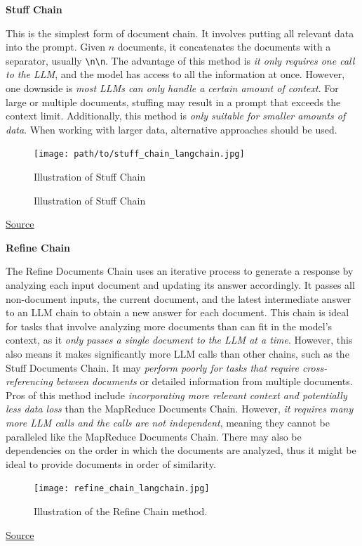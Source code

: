 \documentclass{scrartcl}
\begin{document}
\textbf{Stuff Chain}

This is the simplest form of document chain. It involves putting all relevant data into the prompt. Given \(n\) documents, it concatenates the documents with a separator, usually \verb|\n\n|.
The advantage of this method is \textit{it only requires one call to the LLM}, and the model has access to all the information at once.
However, one downside is \textit{most LLMs can only handle a certain amount of context}. For large or multiple documents, stuffing may result in a prompt that exceeds the context limit.
Additionally, this method is \textit{only suitable for smaller amounts of data}. When working with larger data, alternative approaches should be used.

\begin{figure}[H]
    \centering
    \texttt{[image: path/to/stuff\_chain\_langchain.jpg]}
    \caption{Illustration of Stuff Chain}
    \caption{Illustration of Stuff Chain}
\end{figure}
\href{https://readmedium.com/en/https:/ogre51.medium.com/types-of-chains-in-langchain-823c8878c2e9}{Source}

\textbf{Refine Chain}

The Refine Documents Chain uses an iterative process to generate a response by analyzing each input document and updating its answer accordingly.
It passes all non-document inputs, the current document, and the latest intermediate answer to an LLM chain to obtain a new answer for each document.
This chain is ideal for tasks that involve analyzing more documents than can fit in the model’s context, as it \textit{only passes a single document to the LLM at a time}.
However, this also means it makes significantly more LLM calls than other chains, such as the Stuff Documents Chain. It may \textit{perform poorly for tasks that require cross-referencing between documents} or detailed information from multiple documents.
Pros of this method include \textit{incorporating more relevant context and potentially less data loss} than the MapReduce Documents Chain. However, \textit{it requires many more LLM calls and the calls are not independent}, meaning they cannot be paralleled like the MapReduce Documents Chain.
There may also be dependencies on the order in which the documents are analyzed, thus it might be ideal to provide documents in order of similarity.

\begin{figure}[H]
    \centering
    \texttt{[image: refine\_chain\_langchain.jpg]}
    \caption{Illustration of the Refine Chain method.}
\end{figure}
\href{https://readmedium.com/en/https:/ogre51.medium.com/types-of-chains-in-langchain-823c8878c2e9}{Source}
\end{document}
